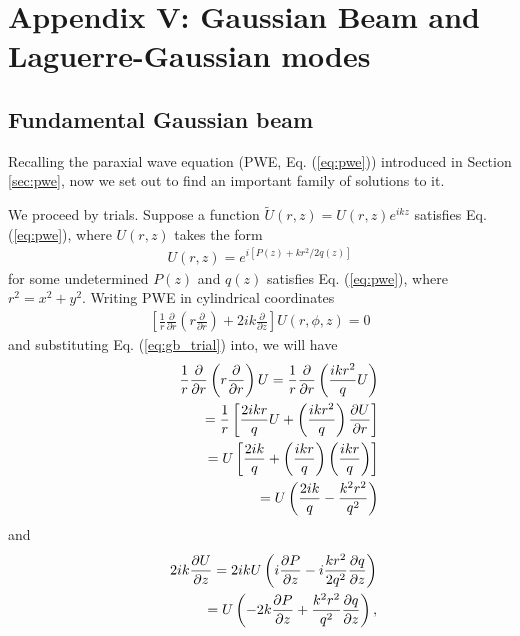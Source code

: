 \section*{Appendix V: Gaussian Beam and Laguerre-Gaussian modes}
\subsection{Fundamental Gaussian beam}
Recalling the paraxial wave equation (PWE, Eq. (\ref{eq:pwe})) introduced in Section \ref{sec:pwe}, now we set out to find an important family of solutions to it.

We proceed by trials. Suppose a function $\tilde{U}(r, z) = U(r, z) e^{i k z}$ satisfies Eq. (\ref{eq:pwe}), where $U(r, z)$ takes the form
\begin{eqnarray}
	U(r,  z) = e^{i [ P(z) + kr^2/2q(z)]}
	\label{eq:gb_trial}
\end{eqnarray}
for some undetermined $P(z)$ and $q(z)$ satisfies Eq. (\ref{eq:pwe}), where $r^2 = x^2 + y^2$.  Writing PWE in cylindrical coordinates
\begin{eqnarray}
	\left[ \frac{1}{r} \frac{\partial}{\partial r} \left( r \frac{\partial}{\partial r}\right) + 2ik \frac{\partial}{\partial z} \right] U(r, \phi, z) = 0
\end{eqnarray}
and substituting Eq. (\ref{eq:gb_trial}) into, we will have
\begin{eqnarray}
	&& \frac{1}{r} \frac{\partial}{\partial r} \left( r \frac{\partial}{\partial r}\right) U
	= \frac{1}{r} \frac{\partial}{\partial r} \left( \frac{ i k r^2}{q} U \right)
	\nonumber\\
	&&\hspace{0.5in} = \frac{1}{r} \left[ \frac{2 i k r}{q} U + \left( \frac{i k r^2}{q}\right)
	\frac{\partial U}{\partial r} \right]
	\nonumber\\
	&&\hspace{0.5in} = U \left[ \frac{2 i k }{q} 
	+ \left( \frac{i k r}{q} \right) \left( \frac{ i k r}{q} \right) \right]
	\nonumber\\
	&&\hspace{0.5in} = U \left( \frac{2 i k }{q} - \frac{k^2 r^2}{q^2} \right) 
\end{eqnarray}
and
\begin{eqnarray}
	&& 2ik \frac{\partial U}{\partial z} = 2ik U \left( i \frac{\partial P}{\partial z}
	- i \frac{k r^2}{2 q^2} \frac{\partial q}{\partial z} \right)
	\nonumber\\
	&&\hspace{0.5in} = U \left( -2k \frac{\partial P}{\partial z} + \frac{k^2 r^2}{q^2} 
	\frac{\partial q}{\partial z} \right),
\end{eqnarray}
